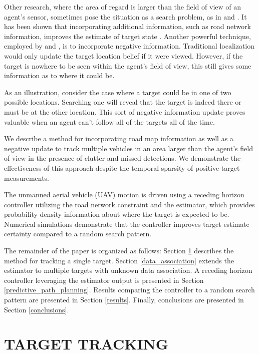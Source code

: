 \documentclass[letterpaper, 10 pt, conference]{ieeeconf}  %
\begin{document}
Other research, where the area of regard is larger than the field of view of an agent's sensor, sometimes pose the situation as a search problem, as in \cite{Allik2017} and \cite{Wong2005}. It has been shown that incorporating additional information, such as road network information, improves the estimate of target state \cite{Cheng2007}. Another powerful technique, employed by \cite{Allik2017} and \cite{Ahmed2017}, is to incorporate negative information. Traditional localization would only update the target location belief if it were viewed. However, if the target is nowhere to be seen within the agent's field of view, this still gives some information as to where it could be.

As an illustration, consider the case where a target could be in one of two possible locations. Searching one will reveal that the target is indeed there or must be at the other location. This sort of negative information update proves valuable when an agent can't follow all of the targets all of the time.

We describe a method for incorporating road map information as well as a negative update to track multiple vehicles in an area larger than the agent's field of view in the presence of clutter and missed detections. We demonstrate the effectiveness of this approach despite the temporal sparsity of positive target measurements.

The unmanned aerial vehicle (UAV) motion is driven using a receding horizon controller utilizing the road network constraint and the estimator, which provides probability density information about where the target is expected to be. Numerical simulations demonstrate that the controller improves target estimate certainty compared to a random search pattern.

The remainder of the paper is organized as follows: Section \ref{target_tracking} describes the method for tracking a single target. Section \ref{data_association} extends the estimator to multiple targets with unknown data association. A receding horizon controller leveraging the estimator output is presented in Section \ref{predictive_path_planning}. Results comparing the controller to a random search pattern are presented in Section \ref{results}. Finally, conclusions are presented in Section \ref{conclusions}.

\section{TARGET TRACKING}\label{target_tracking}
\end{document}
